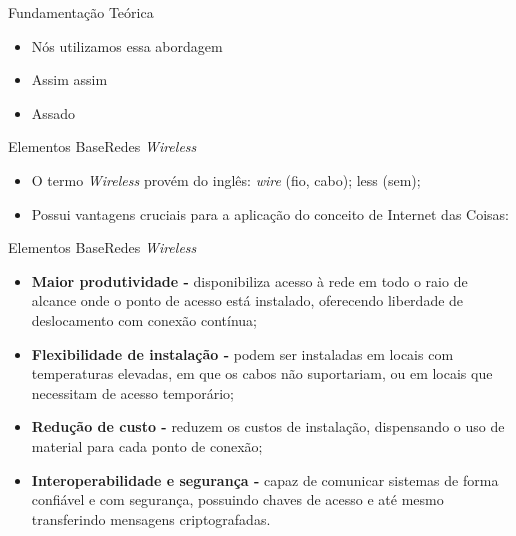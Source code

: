 \begin{frame}{Fundamentação Teórica}
\begin{itemize}
    \item Nós utilizamos essa abordagem
    \item Assim assim
    \item Assado
\end{itemize}
    
\end{frame}

\begin{frame}{Elementos Base}{Redes \textit{Wireless}}
      
\begin{itemize}
    \item O termo \textit{Wireless} provém do inglês: \textit{wire} (fio, cabo); less (sem);
    \medskip
    \item Possui vantagens cruciais para a aplicação do conceito de Internet das Coisas:
\end{itemize}    

\end{frame}

\begin{frame}{Elementos Base}{Redes \textit{Wireless}}
      
    \begin{itemize}
        \item \textbf{Maior produtividade - } disponibiliza acesso à rede em todo o raio de alcance onde o ponto de acesso está instalado, oferecendo liberdade de deslocamento com conexão contínua;
	
        \item \textbf{Flexibilidade de instalação -} podem ser instaladas em locais com temperaturas elevadas, em que os cabos não suportariam, ou em locais que necessitam de acesso temporário;
        
        \item \textbf{Redução de custo - } reduzem os custos de instalação, dispensando o uso de material para cada ponto de conexão;
        
        \item \textbf{Interoperabilidade e segurança - } capaz de comunicar sistemas de forma confiável e com segurança, possuindo chaves de acesso e até mesmo transferindo mensagens criptografadas.   
    \end{itemize}    
    
\end{frame}

